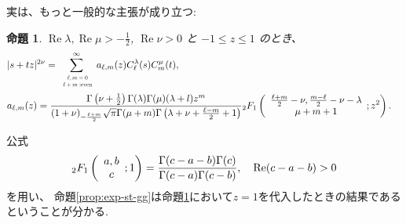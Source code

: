 \documentclass[12pt]{article} %
\newtheorem{prop}{命題}
\theoremstyle{remark}
\newcommand{\tmop}[1]{\ensuremath{\operatorname{#1}}}
\begin{document}
	実は、もっと一般的な主張が成り立つ:
	\begin{prop}\label{prop:exp-stz-gg}
		  \label{thm:4}$\tmop{Re} \lambda, \tmop{Re} \mu > - \frac{1}{2}$,
		    $\tmop{Re} \nu > 0$ と $-1 \leqslant z \leqslant 1$ のとき、
		      \begin{eqnarray}
			      & | s + t z |^{2 \nu}  = \sum_{\scalebox{0.6}{
				      $\begin{array}[]{c}
						  \ell,m=0\\\ell+ m\mbox{ :even}
					  \end{array}
				  $}}^{\infty} a_{\ell, m}
					          (z) C_\ell^{\lambda} (s) C_m^{\mu} (t), &  \nonumber\\
						      & a_{\ell, m} (z) = \frac{\Gamma \left( \nu + \frac{1}{2} \right) \Gamma
						      (\lambda) \Gamma (\mu) (\lambda + l) z^m }{(1 + \nu)_{- \frac{\ell + m}{2}} \sqrt{\pi} \Gamma
										      (\mu + m) \Gamma \left( \lambda + \nu + \frac{\ell - m}{2} + 1 \right)}
										    {}_2 F_1 \left( \begin{array}{c}
								        \frac{\ell + m}{2} - \nu, \frac{m - \ell}{2} - \nu - \lambda\\
									      \mu + m + 1
									          \end{array} ; z^2 \right). & 
										          \nonumber
											    \end{eqnarray}
    \end{prop}
    公式
\begin{equation*}
		{}_2F_1\left( \begin{array}[]{c}
			a,b\\c
		\end{array};1\right)=\frac{\Gamma(c-a-b)\Gamma(c)}{\Gamma(c-a)\Gamma(c-b)},\quad \Re(c-a-b)>0
	\end{equation*}
    を用い、
    命題\ref{prop:exp-st-gg}は命題\ref{prop:exp-stz-gg}において$z=1$を代入したときの結果であるということが分かる.
\end{document}
